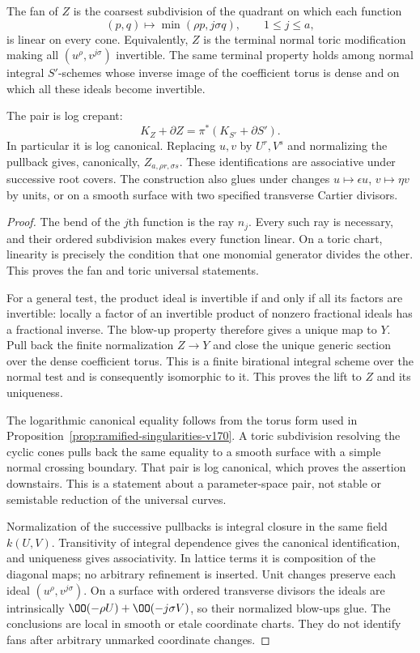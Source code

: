 \begin{proposition}
\label{prop:log-compatibility-v170}
The fan of $Z$ is the coarsest subdivision of the quadrant on which
each function
\[
 (p,q)\longmapsto\min(\rho p,j\sigma q),\qquad1\leq j\leq a,
\]
is linear on every cone. Equivalently, $Z$ is the terminal normal
toric modification making all $(u^\rho,v^{j\sigma})$ invertible.
The same terminal property holds among normal integral $S'$-schemes
whose inverse image of the coefficient torus is dense and on which
all these ideals become invertible.

The pair is log crepant:
\[
 K_Z+\partial Z=\pi^*(K_{S'}+\partial S').
\]
In particular it is log canonical. Replacing $u,v$ by
$U^r,V^s$ and normalizing the pullback gives, canonically,
$Z_{a,\rho r,\sigma s}$. These identifications are associative under
successive root covers. The construction also glues under changes
$u\mapsto\epsilon u$, $v\mapsto\eta v$ by units, or on a smooth
surface with two specified transverse Cartier divisors.
\end{proposition}
\begin{proof}
The bend of the $j$th function is the ray $n_j$. Every such ray is
necessary, and their ordered subdivision makes every function
linear. On a toric chart, linearity is precisely the condition that
one monomial generator divides the other. This proves the fan and
toric universal statements.

For a general test, the product ideal is invertible if and only if
all its factors are invertible: locally a factor of an invertible
product of nonzero fractional ideals has a fractional inverse.
The blow-up property therefore gives a unique map to $Y$. Pull
back the finite normalization $Z\to Y$ and close the unique generic
section over the dense coefficient torus. This is a finite birational
integral scheme over the normal test and is consequently isomorphic
to it. This proves the lift to $Z$ and its uniqueness.

The logarithmic canonical equality follows from the torus form
used in Proposition~\ref{prop:ramified-singularities-v170}. A toric
subdivision resolving the cyclic cones pulls back the same equality
to a smooth surface with a simple normal crossing boundary. That
pair is log canonical, which proves the assertion downstairs. This
is a statement about a parameter-space pair, not stable or semistable
reduction of the universal curves.

Normalization of the successive pullbacks is integral closure in
the same field $k(U,V)$. Transitivity of integral dependence gives
the canonical identification, and uniqueness gives associativity.
In lattice terms it is composition of the diagonal maps; no
arbitrary refinement is inserted. Unit changes preserve each ideal
$(u^\rho,v^{j\sigma})$. On a surface with ordered transverse
divisors the ideals are intrinsically
$\OO(-\rho U)+\OO(-j\sigma V)$, so their normalized blow-ups glue.
The conclusions are local in smooth or etale coordinate charts.
They do not identify fans after arbitrary unmarked coordinate changes.
\end{proof}

